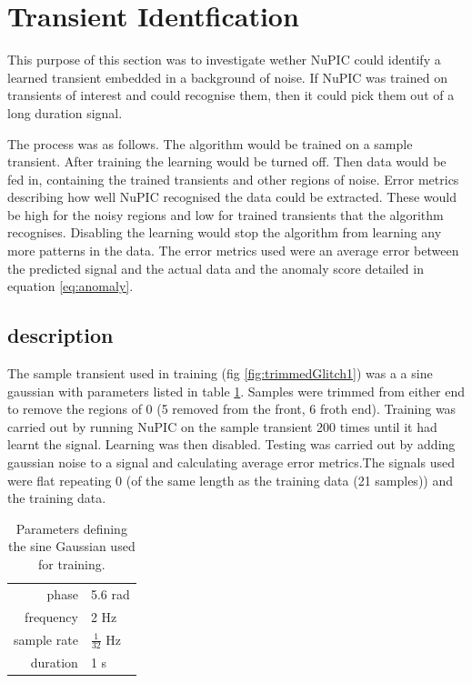 \documentclass[a4paper]{jpconf}
\begin{document}
\section{Transient Identfication}
	This purpose of this section was to investigate wether NuPIC could identify a learned transient embedded in a background of noise. If NuPIC was trained on transients of interest and could recognise them, then it could pick them out of a long duration signal.
	
		The process was as follows. The algorithm would be trained on a sample transient. After training the learning would be turned off. Then data would be fed in, containing the trained transients and other regions of noise. Error metrics describing how well NuPIC recognised the data could be extracted. These would be high for the noisy regions and low for trained transients that the algorithm recognises. Disabling the learning would stop the algorithm from learning any more patterns in the data. The error metrics used were an average error between the predicted signal and the actual data and the anomaly score detailed in equation \ref{eq:anomaly}.
		
	\subsection{description\label{experimentDescription}}
		The sample transient used in training (fig \ref{fig:trimmedGlitch1}) was a a sine gaussian with parameters listed in table \ref{tab:sg}. Samples were trimmed from either end to remove the regions of 0 (5 removed from the front, 6 froth end). Training was carried out by running NuPIC on the sample transient 200 times until it had learnt the signal. Learning was then disabled. Testing was carried out by adding gaussian noise to a signal and calculating average error metrics.The signals used were flat repeating 0 (of the same length as the training data (21 samples)) and the training data.
		\begin{table}
			\centering
			\begin{tabular}{r l}
				phase& 5.6 rad\\
				frequency& 2 Hz\\
				sample rate& $\frac{1}{32}$ Hz\\
				duration& 1 s\\
			\end{tabular}
			\caption{\label{tab:sg}Parameters defining the sine Gaussian used for training.}
		\end{table}
		
\end{document}
